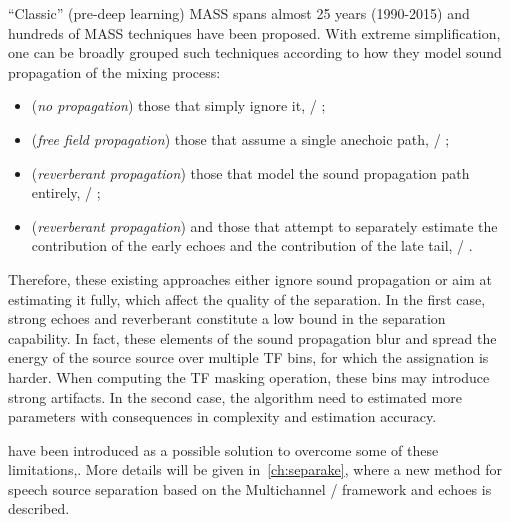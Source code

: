 \mynewline
``Classic'' (pre-deep learning) \ac{MASS} spans almost 25 years (1990-2015) and hundreds of \ac{MASS} techniques have been proposed.
With extreme simplification, one can be broadly grouped such techniques according to how they model sound propagation of the mixing process:
\begin{itemize}
    \item (\textit{no propagation}) those that simply ignore it, \eg/ ;
    \item (\textit{free field propagation}) those that assume a single anechoic path, \eg/  ;
    \item (\textit{reverberant propagation}) those that model the sound propagation path entirely, \eg/ ;
    \item (\textit{reverberant propagation}) and those that attempt to separately estimate the contribution of the early echoes and the contribution of the late tail, \eg/ .
\end{itemize}
Therefore, these existing approaches either ignore sound propagation or aim at estimating it fully, which affect the quality of the separation.
In the first case, strong echoes and reverberant constitute a low bound in the separation capability.
In fact, these elements of the sound propagation blur and spread the energy of the source source over multiple \ac{TF} bins, for which the assignation is harder.
When computing the \ac{TF} masking operation, these bins may introduce strong artifacts.
In the second case, the algorithm need to estimated more parameters with consequences in complexity and estimation accuracy.

 have been introduced as a possible solution to overcome some of these limitations,.
More details will be given in~\cref{ch:separake}, where a new method for speech source separation based on the Multichannel \NMF/ framework and echoes is described.

